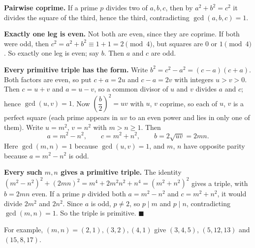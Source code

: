 \textbf{Pairwise coprime.} If a prime $p$ divides two of $a,b,c$, then by $a^2+b^2=c^2$ it divides the square of the third, hence the third, contradicting $\gcd(a,b,c)=1$.

\textbf{Exactly one leg is even.} Not both are even, since they are coprime. If both were odd, then $c^2=a^2+b^2\equiv1+1=2\pmod4$, but squares are $0$ or $1\pmod4$. So exactly one leg is even; say $b$. Then $a$ and $c$ are odd.

\textbf{Every primitive triple has the form.} Write $b^2=c^2-a^2=(c-a)(c+a)$. Both factors are even, so put $c+a=2u$ and $c-a=2v$ with integers $u>v>0$. Then $c=u+v$ and $a=u-v$, so a common divisor of $u$ and $v$ divides $a$ and $c$; hence $\gcd(u,v)=1$. Now $\left(\dfrac b2\right)^2=uv$ with $u$, $v$ coprime, so each of $u$, $v$ is a perfect square (each prime appears in $uv$ to an even power and lies in only one of them). Write $u=m^2$, $v=n^2$ with $m>n\ge1$. Then
\[a=m^2-n^2,\qquad c=m^2+n^2,\qquad b=2\sqrt{uv}=2mn.\]
Here $\gcd(m,n)=1$ because $\gcd(u,v)=1$, and $m$, $n$ have opposite parity because $a=m^2-n^2$ is odd.

\textbf{Every such $m,n$ gives a primitive triple.} The identity $(m^2-n^2)^2+(2mn)^2=m^4+2m^2n^2+n^4=(m^2+n^2)^2$ gives a triple, with $b=2mn$ even. If a prime $p$ divided both $a=m^2-n^2$ and $c=m^2+n^2$, it would divide $2m^2$ and $2n^2$. Since $a$ is odd, $p\ne2$, so $p\mid m$ and $p\mid n$, contradicting $\gcd(m,n)=1$. So the triple is primitive. $\blacksquare$

For example, $(m,n)=(2,1),(3,2),(4,1)$ give $(3,4,5)$, $(5,12,13)$ and $(15,8,17)$.
